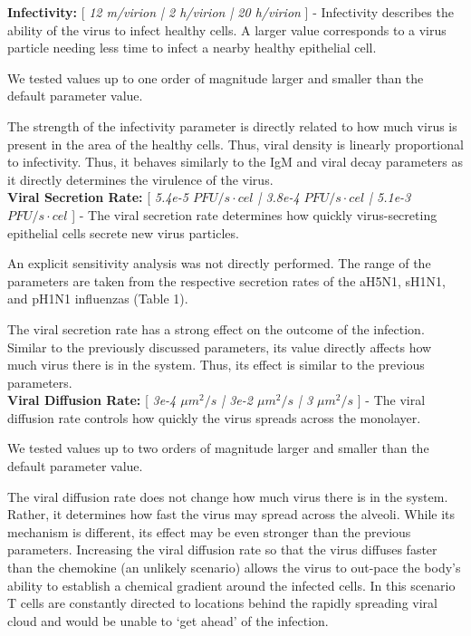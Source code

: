 \documentclass[preprint,10pt,authoryear]{elsarticle}
\begin{document}
\textbf{Infectivity:} [ \textit{12 m/virion | 2 h/virion | 20 h/virion} ] - Infectivity describes the ability of the virus to infect healthy cells.  A larger value corresponds to a virus particle needing less time to infect a nearby healthy epithelial cell.

We tested values up to one order of magnitude larger and smaller than the default parameter value.

The strength of the infectivity parameter is directly related to how much virus is present in the area of the healthy cells.  Thus, viral density is linearly proportional to infectivity.  Thus, it behaves similarly to the IgM and viral decay parameters as it directly determines the virulence of the virus. \\


\textbf{Viral Secretion Rate:} [ \textit{5.4e-5 $PFU/s\cdot cel$ | 3.8e-4 $PFU/s\cdot cel$ | 5.1e-3 $PFU/s\cdot cel$} ] - The viral secretion rate determines how quickly virus-secreting epithelial cells secrete new virus particles.

An explicit sensitivity analysis was not directly performed.  The range of the parameters are taken from the respective secretion rates of the aH5N1, sH1N1, and pH1N1 influenzas (Table 1).

The viral secretion rate has a strong effect on the outcome of the infection.  Similar to the previously discussed parameters, its value directly affects how much virus there is in the system.  Thus, its effect is similar to the previous parameters. \\


\textbf{Viral Diffusion Rate:} [ \textit{3e-4 $\mu m^2/s$ | 3e-2 $\mu m^2/s$ | 3 $\mu m^2/s$} ] - The viral diffusion rate controls how quickly the virus spreads across the monolayer.

We tested values up to two orders of magnitude larger and smaller than the default parameter value.

The viral diffusion rate does not change how much virus there is in the system.  Rather, it determines how fast the virus may spread across the alveoli.  While its mechanism is different, its effect may be even stronger than the previous parameters.  Increasing the viral diffusion rate so that the virus diffuses faster than the chemokine (an unlikely scenario) allows the virus to out-pace the body's ability to establish a chemical gradient around the infected cells.  In this scenario T cells are constantly directed to locations behind the rapidly spreading viral cloud and would be unable to `get ahead' of the infection. \\
\end{document}
